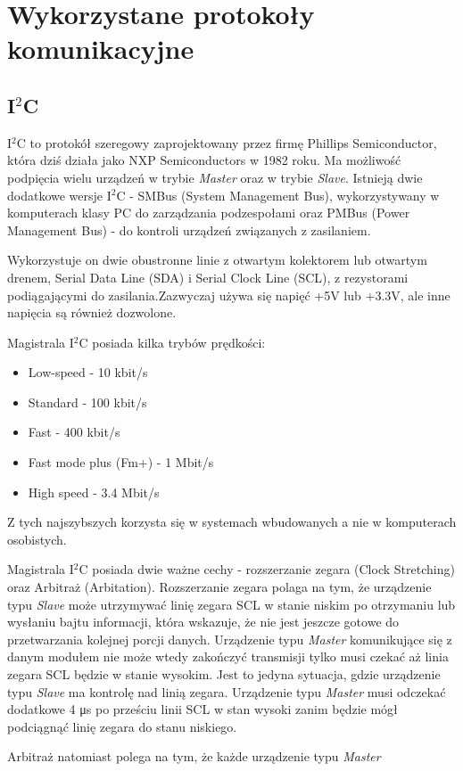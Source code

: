 \documentclass[12pt,a4paper,oneside]{memoir}
\begin{document}
\chapter{Wykorzystane protokoły komunikacyjne}
\section{I$^2$C}
\par I$^2$C \cite{i2cwiki} to protokół szeregowy zaprojektowany przez firmę Phillips Semiconductor, która dziś działa jako NXP Semiconductors w 1982 roku. Ma możliwość podpięcia wielu urządzeń w trybie \textit{Master} oraz w trybie \textit{Slave}. Istnieją dwie dodatkowe wersje I$^2$C - SMBus (System Management Bus), wykorzystywany w komputerach klasy PC do zarządzania podzespołami oraz PMBus (Power Management Bus) - do kontroli urządzeń związanych z zasilaniem. 
\par Wykorzystuje on dwie obustronne linie z otwartym kolektorem lub otwartym drenem, Serial Data Line (SDA) i Serial Clock Line (SCL), z rezystorami podiągającymi do zasilania.Zazwyczaj używa się napięć +5V lub +3.3V, ale inne napięcia są również dozwolone.
\par Magistrala I$^2$C posiada kilka trybów prędkości:
\begin{itemize}
	\item Low-speed - 10 kbit/s
	\item Standard - 100 kbit/s
	\item Fast - 400 kbit/s
	\item Fast mode plus (Fm+) - 1 Mbit/s
	\item High speed - 3.4 Mbit/s
\end{itemize}
\par Z tych najszybszych korzysta się w systemach wbudowanych a nie w komputerach osobistych.\\
\par Magistrala I$^2$C posiada dwie ważne cechy - rozszerzanie zegara (Clock Stretching) oraz Arbitraż (Arbitation). 
Rozszerzanie zegara polaga na tym, że urządzenie typu \textit{Slave} może utrzymywać linię zegara SCL w stanie niskim po otrzymaniu lub wysłaniu bajtu informacji, która wskazuje, że nie jest jeszcze gotowe do przetwarzania kolejnej porcji danych. Urządzenie typu \textit{Master} komunikujące się z danym modułem nie może wtedy zakończyć transmisji tylko musi czekać aż linia zegara SCL będzie w stanie wysokim. Jest to jedyna sytuacja, gdzie urządzenie typu \textit{Slave} ma kontrolę nad linią zegara. Urządzenie typu \textit{Master} musi odczekać dodatkowe 4 μs po prześciu linii SCL w stan wysoki zanim będzie mógł podciągnąć linię zegara do stanu niskiego.
\par Arbitraż natomiast polega na tym, że każde urządzenie typu \textit{Master}
\end{document}
